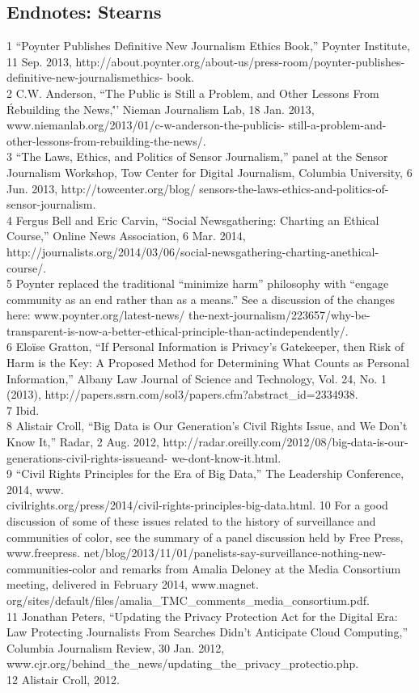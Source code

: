 \begin{itemize}
\section{Endnotes: Stearns}
1 ``Poynter Publishes Definitive New Journalism Ethics Book,'' Poynter Institute, 11 Sep. 2013,
http://about.poynter.org/about-us/press-room/poynter-publishes-definitive-new-journalismethics-
book.\\
2 C.W. Anderson, ``The Public is Still a Problem, and Other Lessons From \'Rebuilding the News,\'''
Nieman Journalism Lab, 18 Jan. 2013, www.niemanlab.org/2013/01/c-w-anderson-the-publicis-
still-a-problem-and-other-lessons-from-rebuilding-the-news/.\\
3 ``The Laws, Ethics, and Politics of Sensor Journalism,'' panel at the Sensor Journalism Workshop,
Tow Center for Digital Journalism, Columbia University, 6 Jun. 2013, http://towcenter.org/blog/
sensors-the-laws-ethics-and-politics-of-sensor-journalism.\\
4 Fergus Bell and Eric Carvin, ``Social Newsgathering: Charting an Ethical Course,'' Online News
Association, 6 Mar. 2014, http://journalists.org/2014/03/06/social-newsgathering-charting-anethical-
course/.\\
5 Poynter replaced the traditional ``minimize harm'' philosophy with ``engage community as an end
rather than as a means.'' See a discussion of the changes here: www.poynter.org/latest-news/
the-next-journalism/223657/why-be-transparent-is-now-a-better-ethical-principle-than-actindependently/.\\
6 Eloïse Gratton, ``If Personal Information is Privacy's Gatekeeper, then Risk of Harm is the Key: A
Proposed Method for Determining What Counts as Personal Information,'' Albany Law Journal of
Science and Technology, Vol. 24, No. 1 (2013), http://papers.ssrn.com/sol3/papers.cfm?abstract_id=2334938.\\
7 Ibid.\\
8 Alistair Croll, ``Big Data is Our Generation's Civil Rights Issue, and We Don't Know It,'' Radar, 2 Aug. 2012, http://radar.oreilly.com/2012/08/big-data-is-our-generations-civil-rights-issueand-
we-dont-know-it.html.\\
9 ``Civil Rights Principles for the Era of Big Data,'' The Leadership Conference, 2014, www.\\
civilrights.org/press/2014/civil-rights-principles-big-data.html.
10 For a good discussion of some of these issues related to the history of surveillance and
communities of color, see the summary of a panel discussion held by Free Press, www.freepress.
net/blog/2013/11/01/panelists-say-surveillance-nothing-new-communities-color and remarks
from Amalia Deloney at the Media Consortium meeting, delivered in February 2014, www.magnet.
org/sites/default/files/amalia_TMC_comments_media_consortium.pdf.\\
11 Jonathan Peters, ``Updating the Privacy Protection Act for the Digital Era: Law Protecting
Journalists From Searches Didn't Anticipate Cloud Computing,'' Columbia Journalism Review, 30
Jan. 2012, www.cjr.org/behind_the_news/updating_the_privacy_protectio.php.\\
12 Alistair Croll, 2012.\\


\end{itemize}
